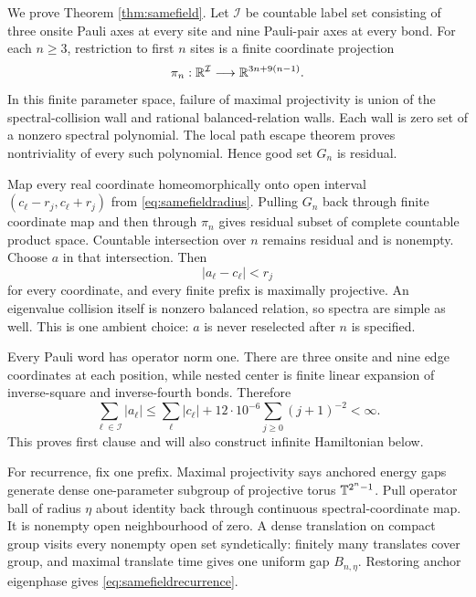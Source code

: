 We prove Theorem \ref{thm:samefield}.  Let $\mathcal I$ be countable label
set consisting of three onsite Pauli axes at every site and nine Pauli-pair
axes at every bond.  For each $n\ge3$, restriction to first $n$ sites is a
finite coordinate projection
\[
 \pi_n:\mathbb R^{\mathcal I}\longrightarrow\mathbb R^{3n+9(n-1)}.
\]
In this finite parameter space, failure of maximal projectivity is union of
the spectral-collision wall and rational balanced-relation walls.  Each wall
is zero set of a nonzero spectral polynomial.  The local path escape theorem
proves nontriviality of every such polynomial.  Hence good set $G_n$ is
residual.

Map every real coordinate homeomorphically onto open interval
$(c_\ell-r_j,c_\ell+r_j)$ from \eqref{eq:samefieldradius}.  Pulling $G_n$
back through finite coordinate map and then through $\pi_n$ gives residual
subset of complete countable product space.  Countable intersection over
$n$ remains residual and is nonempty.  Choose $a$ in that intersection.
Then
\begin{equation}
 |a_\ell-c_\ell|<r_j                                  \label{eq:samefieldboxproof}
\end{equation}
for every coordinate, and every finite prefix is maximally projective.  An
eigenvalue collision itself is nonzero balanced relation, so spectra are
simple as well.  This is one ambient choice: $a$ is never reselected after
$n$ is specified.

Every Pauli word has operator norm one.  There are three onsite and nine edge
coordinates at each position, while nested center is finite linear expansion
of inverse-square and inverse-fourth bonds.  Therefore
\begin{equation}
 \sum_{\ell\in\mathcal I}|a_\ell|
 \le \sum_\ell|c_\ell|+
     12\cdot10^{-6}\sum_{j\ge0}(j+1)^{-2}<\infty.      \label{eq:samefieldlone}
\end{equation}
This proves first clause and will also construct infinite Hamiltonian below.

For recurrence, fix one prefix.  Maximal projectivity says anchored energy
gaps generate dense one-parameter subgroup of projective torus
$\mathbb T^{2^n-1}$.  Pull operator ball of radius $\eta$ about identity back through
continuous spectral-coordinate map.  It is nonempty open neighbourhood of
zero.  A dense translation on compact group visits every nonempty open set
syndetically: finitely many translates cover group, and maximal translate
time gives one uniform gap $B_{n,\eta}$.  Restoring anchor eigenphase gives
\eqref{eq:samefieldrecurrence}.

